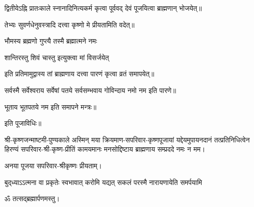\begin{center}
द्वितीयेऽह्नि प्रातःकाले स्नानादिनित्यकर्म कृत्वा पूर्ववद् देवं पूजयित्वा ब्राह्मणान् भोजयेत्॥

तेभ्यः सुवर्णधेनुवस्त्रादि दत्त्वा कृष्णो मे प्रीयतामिति वदेत्॥

{भौमस्य ब्रह्मणो गुप्त्यै तस्मै ब्रह्मात्मने नमः}

{शान्तिरस्तु शिवं चास्तु इत्युक्त्वा मां विसर्जयेत्}

इति प्रतिमामुद्वास्य तां ब्राह्मणाय दत्त्वा पारणं कृत्वा व्रतं समापयेत्॥

सर्वस्मै सर्वेश्वराय सर्वेषां पतये सर्वसम्भवाय गोविन्दाय नमो नम इति पारणे॥

भूताय भूतपतये नम इति समापने मन्त्रः॥

इति पूजाविधिः॥

\closesub

\hiranyagarbha

श्री-कृष्णजन्माष्टमी-पुण्यकाले अस्मिन् मया क्रियमाण-सपरिवार-कृष्णपूजायां यद्देयमुपायनदानं तत्प्रतिनिधित्वेन हिरण्यं सपरिवार-श्री-कृष्ण-प्रीतिं कामयमानः मनसोद्दिष्टाय ब्राह्मणाय सम्प्रददे नमः न मम।

अनया पूजया सपरिवार-श्रीकृष्णः प्रीयताम्।

{बुद्‌ध्याऽऽत्मना वा प्रकृतेः स्वभावात्}
{करोमि यद्यत् सकलं परस्मै}
{नारायणायेति समर्पयामि}

ॐ तत्सद्ब्रह्मार्पणमस्तु।

\closesection

\end{center}





\closesection